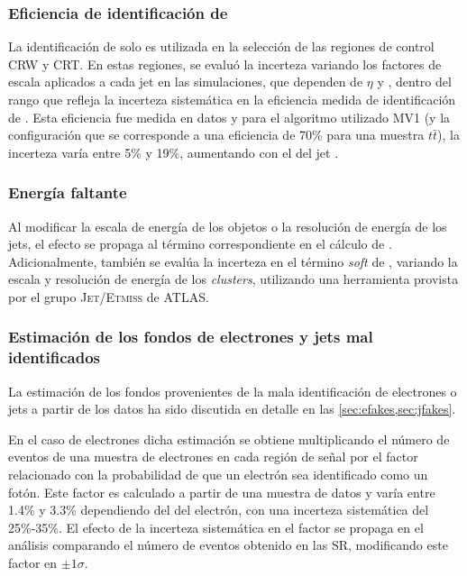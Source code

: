 \subsubsection{Eficiencia de identificación de {\bjets}}

La identificación de {\bjets} solo es utilizada en la selección de las regiones
de control CRW y CRT. En estas regiones, se evaluó la incerteza
variando los factores de escala aplicados a cada jet en las simulaciones, que
dependen de $\eta$ y {\pt}, dentro del rango que refleja la incerteza sistemática
en la eficiencia medida de identificación de {\bjets}. Esta eficiencia fue
medida en datos y para el algoritmo utilizado MV1 (y la configuración que se
corresponde a una eficiencia de 70\% para una muestra $t\bar{t}$), la
incerteza varía entre 5\% y 19\%, aumentando con el {\pt} del jet
\cite{btagging}.



\subsubsection{Energía faltante}

Al modificar la escala de energía de los objetos o la resolución de energía de los jets, el
efecto se propaga al término correspondiente en el cálculo de {\met}.
Adicionalmente, también se evalúa la incerteza en el término \emph{soft} de {\met}, variando
la escala y resolución de energía de los \emph{clusters}, utilizando una herramienta provista por
el grupo \textsc{Jet/Etmiss} de ATLAS.


\subsubsection{Estimación de los fondos de electrones y jets mal identificados}

La estimación de los fondos provenientes de la mala identificación de electrones
o jets a partir de los datos ha sido discutida en detalle en las \cref{sec:efakes,sec:jfakes}.

En el caso de electrones dicha estimación se obtiene multiplicando el número de eventos
de una muestra de electrones en cada región de señal por el factor {\feg} relacionado
con la probabilidad de que un electrón sea identificado como un fotón.
Este factor es calculado a partir de una muestra de datos {\Zee} y varía entre 1.4\% y 3.3\%
dependiendo del {\abseta} del electrón, con una incerteza sistemática del 25\%-35\%.
El efecto de la incerteza sistemática en el factor {\feg} se propaga en
el análisis comparando el número de eventos obtenido en las SR, modificando este factor
en $\pm 1\sigma$.

